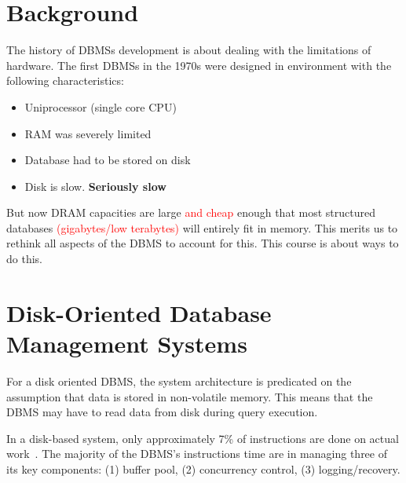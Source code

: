 \documentclass[11pt]{article}
\newcommand{\rr}[1]{\textcolor{red}{#1}}
\begin{document}
\maketitle
\thispagestyle{plain}

\section{Background}
The history of DBMSs development is about dealing with the limitations of hardware.
The first DBMSs in the 1970s were designed in environment with the following characteristics:
\begin{itemize}
    \item Uniprocessor (single core CPU)
    \item RAM was severely limited
    \item Database had to be stored on disk
    \item Disk is slow. \textbf{Seriously slow}
\end{itemize}
   
But now DRAM capacities are large \rr{and cheap} enough that most structured databases \rr{(gigabytes/low terabytes)} will entirely fit in memory.
This merits us to rethink all aspects of the DBMS to account for this. This course is about ways to 
do this.

\section{Disk-Oriented Database Management Systems}
For a disk oriented DBMS, the system architecture is predicated on the assumption that data 
is stored in non-volatile memory. This means that the DBMS may have to read data from disk during 
query execution.

In a disk-based system, only approximately 7\% of instructions are done on actual 
work~\cite{harizopoulos08}. The majority of the DBMS's instructions time are in managing 
three of its key components: (1) buffer pool, (2) concurrency control, (3) logging/recovery.

\end{document}
